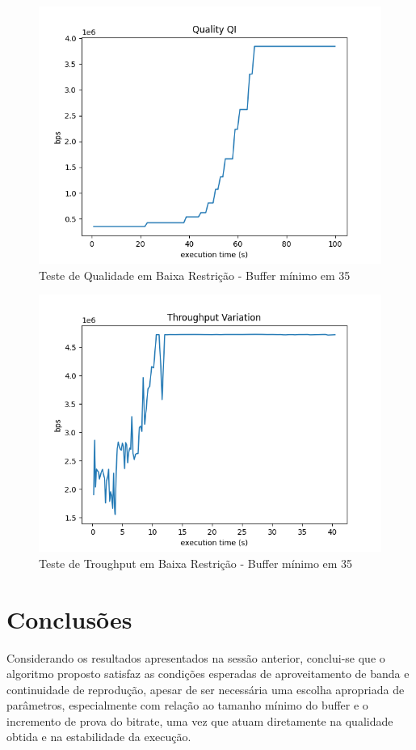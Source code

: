\documentclass[10pt,twocolumn,letterpaper]{article}
\begin{document}
	\begin{figure}
		\centering
		\includegraphics[width=\linewidth]{playback_quality_qi35.png}
		\caption{Teste de Qualidade em Baixa Restrição - Buffer mínimo em 35}
		\label{fig:9}
	\end{figure}
	
	\begin{figure}
		\centering
		\includegraphics[width=\linewidth]{throughput35.png}
		\caption{Teste de Troughput em Baixa Restrição - Buffer mínimo em 35}
		\label{fig:10}
	\end{figure}
	\section{Conclusões}
	Considerando os resultados apresentados na sessão anterior, conclui-se que o algoritmo proposto satisfaz as condições esperadas de aproveitamento de banda e continuidade de reprodução, apesar de ser necessária uma escolha apropriada de parâmetros, especialmente com relação ao tamanho mínimo do buffer e o incremento de prova do bitrate, uma vez que atuam diretamente na qualidade obtida e na estabilidade da execução. 
	
\end{document}

